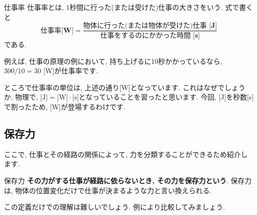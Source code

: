 \documentclass[11pt,dvipdfmx]{jsarticle}
\numberwithin{equation}{section} %
\begin{document}
\begin{freebox}{仕事率}
    仕事率とは, 1秒間に行った(または受けた)仕事の大きさをいう. 式で書くと
    \begin{equation}
        \textbf{仕事率[W]} = \frac{\textbf{物体に行った(または物体が受けた)仕事 [J]}}{\textbf{仕事をするのにかかった時間 [s]}} \label{仕事率}
    \end{equation}
    である. 
\end{freebox}
 
例えば, 仕事の原理の例において, 持ち上げるに10秒かかっているなら, $300/10 = 30$ [W]が仕事率です. 

ところで仕事率の単位は, 上述の通り[W]となっています. これはなぜでしょうか. 物理で, $\text{[J]} = \text{[W]} \cdot \text{[s]}$となっていることを習ったと思います. 今回, [J]を秒数[s]で割ったため, [W]が登場するわけです. 
\subsection{保存力}\label{保存力}
ここで, 仕事とその経路の関係によって, 力を分類することができるため紹介します.  
\begin{freebox}{保存力}
\textbf{その力がする仕事が経路に依らないとき, その力を保存力という}. 保存力は, 物体の位置変化だけで仕事が決まるような力と言い換えられる.
\end{freebox}
この定義だけでの理解は難しいでしょう. 例により比較してみましょう. 
\end{document}
